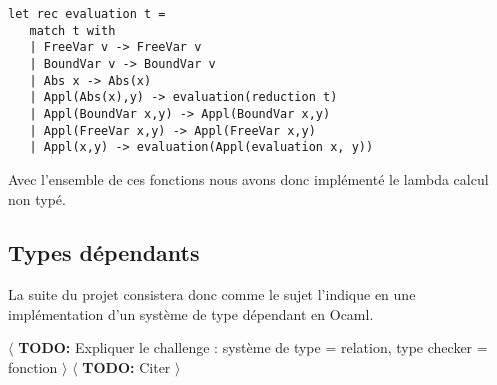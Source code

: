 \documentclass{article}
\newcommand{\TODO}[1]{$\langle$ \textbf{TODO:} #1 $\rangle$}
\theoremstyle{definition}
\theoremstyle{remark}
\begin{document}
\begin{verbatim}
let rec evaluation t =
   match t with  
   | FreeVar v -> FreeVar v  
   | BoundVar v -> BoundVar v  
   | Abs x -> Abs(x) 
   | Appl(Abs(x),y) -> evaluation(reduction t) 
   | Appl(BoundVar x,y) -> Appl(BoundVar x,y)  
   | Appl(FreeVar x,y) -> Appl(FreeVar x,y)  
   | Appl(x,y) -> evaluation(Appl(evaluation x, y))
\end{verbatim}

Avec l'ensemble de ces fonctions nous avons donc implémenté le lambda
calcul non typé.


\subsection{Types dépendants}


La suite du projet consistera donc comme le sujet l'indique en une
implémentation d'un système de type dépendant en Ocaml.

\TODO{Expliquer le challenge : système de type = relation, type checker = fonction}
\TODO{Citer \citep{loeh:tuto-dependant,coquand:mini-tt}}




 
\end{document}
